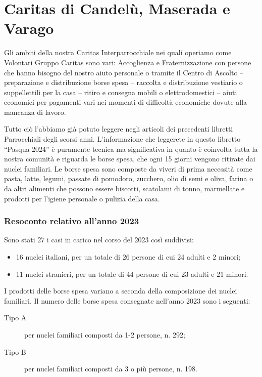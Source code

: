 \section{Caritas di Candelù, Maserada e Varago}

Gli ambiti della nostra Caritas Interparrocchiale nei quali operiamo come Volontari Gruppo Caritas sono vari: Accoglienza e Fraternizzazione con persone che hanno bisogno del nostro aiuto personale o tramite il Centro di Ascolto -- preparazione e distribuzione borse spesa -- raccolta e distribuzione vestiario o suppellettili per la casa -- ritiro e consegna mobili o elettrodomestici -- aiuti economici per pagamenti vari nei momenti di difficoltà economiche dovute alla mancanza di lavoro.

Tutto ciò l’abbiamo già potuto leggere negli articoli dei precedenti libretti Parrocchiali degli scorsi anni.
L’informazione che leggerete in questo libretto “Pasqua 2024” è puramente tecnica ma significativa in quanto è coinvolta tutta la nostra comunità e riguarda le borse spesa, che ogni 15 giorni vengono ritirate dai nuclei familiari. Le borse spesa sono composte da viveri di prima necessità come pasta, latte, legumi, passate di pomodoro, zucchero, olio di semi e oliva, farina o da altri alimenti che possono essere biscotti, scatolami di tonno, marmellate e prodotti per l’igiene personale o pulizia della casa.

\pagebreak
\subsubsection{Resoconto relativo all’anno 2023}

Sono stati 27 i casi in carico nel corso del 2023 così suddivisi:
\begin{itemize}
	\item 16 nuclei italiani, per un totale di 26 persone di cui 24 adulti e 2 minori;
	\item 11 nuclei stranieri, per un totale di 44 persone di cui 23 adulti e 21 minori.
\end{itemize}

I prodotti delle borse spesa variano a seconda della composizione dei nuclei familiari. Il numero delle borse spesa consegnate nell’anno 2023 sono i seguenti:
\begin{description}
	\item[Tipo A] per nuclei familiari composti da 1-2 persone, n. 292;
	\item[Tipo B] per nuclei familiari composti da 3 o più persone, n. 198.
\end{description}

